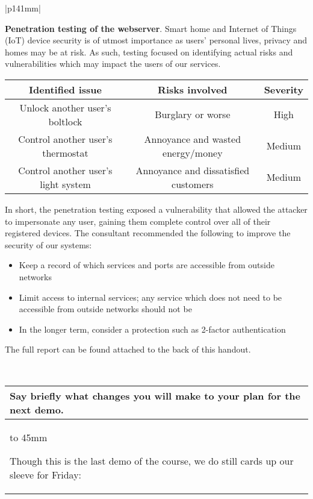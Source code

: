 \documentclass[a4paper]{article}
\newcommand{\colWidth}{141mm}
\begin{document}
\begin{center}
\begin{tabular}{|p{\colWidth}|}
{	\vspace{3mm}

	\textbf{Penetration testing of the webserver}.
	Smart home and Internet of Things (IoT) device security is of utmost importance as users' personal lives,
	privacy and homes may be at risk. As such, testing focused on identifying actual risks and vulnerabilities
	which may impact the users of our services.

	\vspace{3mm}

	\begin{tabular}{| c | c | c |} \hline
		\textbf{Identified issue} & \textbf{Risks involved} & \textbf{Severity} \\ \hline
		Unlock another user's boltlock & Burglary or worse & High \\
		Control another user's thermostat & Annoyance and wasted energy/money & Medium \\
		Control another user's light system & Annoyance and dissatisfied customers & Medium \\ \hline
	\end{tabular}

	\vspace{3mm}

	In short, the penetration testing exposed a vulnerability that allowed the attacker to impersonate
	any user, gaining them complete control over all of their registered devices. The consultant recommended
	the following to improve the security of our systems:

	\begin{itemize}
		\item Keep a record of which services and ports are accessible from outside networks
		\item Limit access to internal services; any service which does not need to be accessible from outside networks should not be
		\item In the longer term, consider a protection such as 2-factor authentication
	\end{itemize}

	The full report can be found attached to the back of this handout.
  }
  \\
  \hline
\end{tabular}
\vskip 5mm


\begin{tabular}{|p{\colWidth}|}
	\hline
	\cellcolor{blue!25}\large
	\textbf{Say briefly what changes you will make to your plan for the next demo.}
	\\ \hline
	\vtop to 45mm{
		Though this is the last demo of the course, we do still cards up our sleeve for Friday:

}
\end{tabular}
\end{center}
\end{document}
